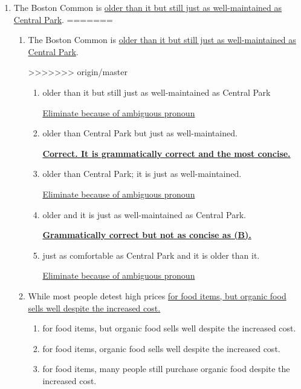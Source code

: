 \begin{enumerate}
\item The Boston Common is \ul{older than it but still just as well-maintained as Central Park}.
=======
\begin{enumerate}
\item The Boston Common is \ul{older than it but still just as well-maintained as Central Park}.

>>>>>>> origin/master
\begin{enumerate}[label=(\Alph*)]
\item older than it but still just as well-maintained as Central Park

\ul{Eliminate because of ambiguous pronoun}
  
\item older than Central Park but just as well-maintained.

\textbf{\ul{Correct. It is grammatically correct and the most concise.}}

\item  older than Central Park; it is just as well-maintained.

\ul{Eliminate because of ambiguous pronoun}
  
\item older and it is just as well-maintained as Central Park.

\textbf{\ul{Grammatically correct but not as concise as (B).}}

\item just as comfortable as Central Park and it is older than it.

\ul{Eliminate because of ambiguous pronoun}
\end{enumerate}

\bigskip
\item While most people detest high prices \ul{for food items, but organic food sells well despite the increased cost.}

\begin{spacing}{1.5}
\begin{enumerate}[label=(\Alph*)]
\item for food items, but organic food sells well despite the increased cost.

\hrulefill
 
\item for food items, organic food sells well despite the increased cost.

\hrulefill
 
\item for food items, many people still purchase organic food despite the increased cost.


\end{enumerate}
\end{spacing}
\end{enumerate}
\end{enumerate}
